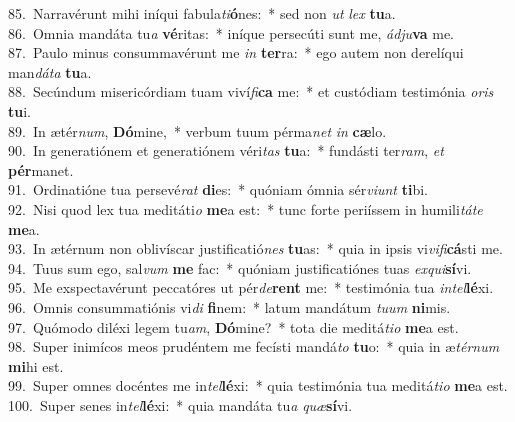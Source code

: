 {85.~}Narravérunt mihi iníqui fabula\textit{ti}\textbf{ó}nes:~* sed non \textit{ut} \textit{lex} \textbf{tu}a.\\
{86.~}Omnia mandáta tu\textit{a} \textbf{vé}ritas:~* iníque persecúti sunt me, \textit{ád}\textit{ju}\textbf{va} me.\\
{87.~}Paulo minus consummavérunt me \textit{in} \textbf{ter}ra:~* ego autem non derelíqui man\textit{dá}\textit{ta} \textbf{tu}a.\\
{88.~}Secúndum misericórdiam tuam viví\textit{fi}\textbf{ca} me:~* et custódiam testimónia \textit{o}\textit{ris} \textbf{tu}i.\\
{89.~}In ætér\textit{num}, \textbf{Dó}mine,~* verbum tuum pérma\textit{net} \textit{in} \textbf{cæ}lo.\\
{90.~}In generatiónem et generatiónem véri\textit{tas} \textbf{tu}a:~* fundásti ter\textit{ram}, \textit{et} \textbf{pér}manet.\\
{91.~}Ordinatióne tua persevé\textit{rat} \textbf{di}es:~* quóniam ómnia sér\textit{vi}\textit{unt} \textbf{ti}bi.\\
{92.~}Nisi quod lex tua meditáti\textit{o} \textbf{me}a est:~* tunc forte periíssem in humili\textit{tá}\textit{te} \textbf{me}a.\\
{93.~}In ætérnum non oblivíscar justificatió\textit{nes} \textbf{tu}as:~* quia in ipsis vi\textit{vi}\textit{fi}\textbf{cá}sti me.\\
{94.~}Tuus sum ego, sal\textit{vum} \textbf{me} fac:~* quóniam justificatiónes tuas \textit{ex}\textit{qui}\textbf{sí}vi.\\
{95.~}Me exspectavérunt peccatóres ut pér\textit{de}\textbf{rent} me:~* testimónia tua \textit{in}\textit{tel}\textbf{lé}xi.\\
{96.~}Omnis consummatiónis vi\textit{di} \textbf{fi}nem:~* latum mandátum \textit{tu}\textit{um} \textbf{ni}mis.\\
{97.~}Quómodo diléxi legem tu\textit{am}, \textbf{Dó}mine?~* tota die meditá\textit{ti}\textit{o} \textbf{me}a est.\\
{98.~}Super inimícos meos prudéntem me fecísti mandá\textit{to} \textbf{tu}o:~* quia in æ\textit{tér}\textit{num} \textbf{mi}hi est.\\
{99.~}Super omnes docéntes me in\textit{tel}\textbf{lé}xi:~* quia testimónia tua meditá\textit{ti}\textit{o} \textbf{me}a est.\\
{100.~}Super senes in\textit{tel}\textbf{lé}xi:~* quia mandáta tu\textit{a} \textit{quæ}\textbf{sí}vi.\\

